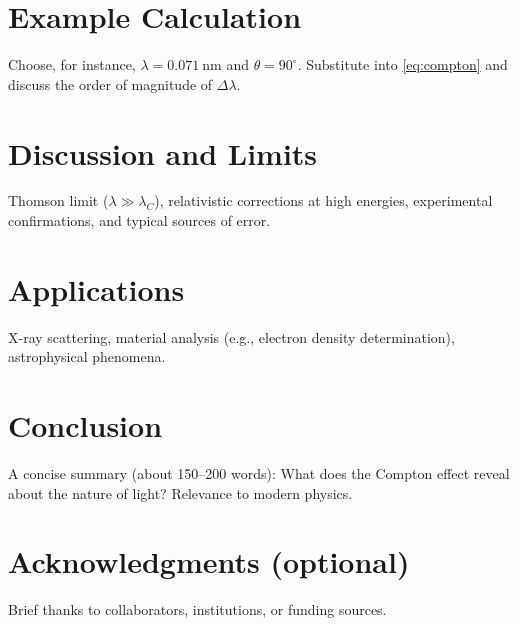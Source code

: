 \documentclass[12pt,oneside]{scrartcl}
\renewcommand*{\bibfont}{\small}
\begin{document}
	\section{Example Calculation}
	Choose, for instance, $\lambda = \SI{0.071}{\nano\meter}$ and $\theta = 90^\circ$. Substitute into \cref{eq:compton} and discuss the order of magnitude of $\Delta\lambda$.
	
	\section{Discussion and Limits}
	Thomson limit ($\lambda \gg \lambda_C$), relativistic corrections at high energies, experimental confirmations, and typical sources of error.
	
	\section{Applications}
	X-ray scattering, material analysis (e.g., electron density determination), astrophysical phenomena.
	
	\section{Conclusion}
	A concise summary (about 150–200 words): What does the Compton effect reveal about the nature of light? Relevance to modern physics.
	
	\section*{Acknowledgments (optional)}
	Brief thanks to collaborators, institutions, or funding sources.
	
	\renewcommand*{\bibfont}{\small}
\printbibliography

	
	\clearpage
	\thispagestyle{empty}
	
\end{document}
